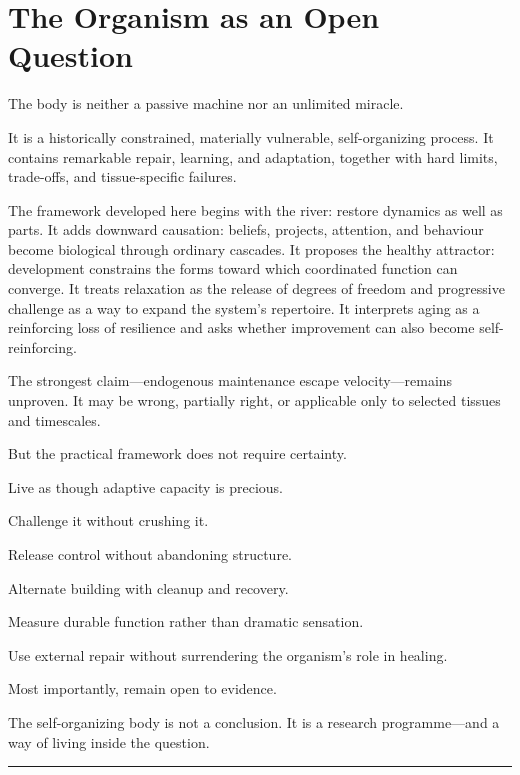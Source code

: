 \chapter{The Organism as an Open Question}

The body is neither a passive machine nor an unlimited miracle.

It is a historically constrained, materially vulnerable, self-organizing process. It contains remarkable repair, learning, and adaptation, together with hard limits, trade-offs, and tissue-specific failures.

The framework developed here begins with the river: restore dynamics as well as parts. It adds downward causation: beliefs, projects, attention, and behaviour become biological through ordinary cascades. It proposes the healthy attractor: development constrains the forms toward which coordinated function can converge. It treats relaxation as the release of degrees of freedom and progressive challenge as a way to expand the system's repertoire. It interprets aging as a reinforcing loss of resilience and asks whether improvement can also become self-reinforcing.

The strongest claim---endogenous maintenance escape velocity---remains unproven. It may be wrong, partially right, or applicable only to selected tissues and timescales.

But the practical framework does not require certainty.

Live as though adaptive capacity is precious.

Challenge it without crushing it.

Release control without abandoning structure.

Alternate building with cleanup and recovery.

Measure durable function rather than dramatic sensation.

Use external repair without surrendering the organism's role in healing.

Most importantly, remain open to evidence.

The self-organizing body is not a conclusion. It is a research programme---and a way of living inside the question.

\begin{center}\rule{0.5\linewidth}{0.5pt}\end{center}
